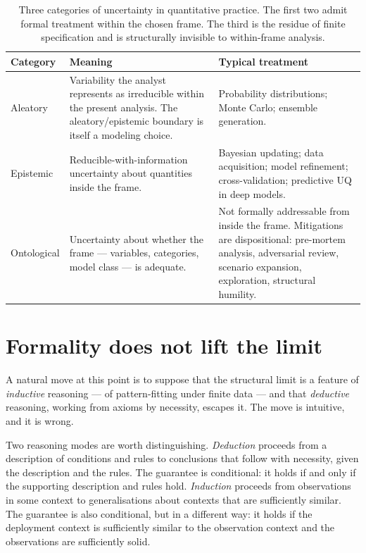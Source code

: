 \documentclass[11pt,a4paper]{article}
\begin{document}
\begin{table}[t]
\centering
\small
\begin{tabular}{p{} p{} p{}}
\toprule
\textbf{Category} & \textbf{Meaning} & \textbf{Typical treatment} \\
\midrule
Aleatory & Variability the analyst represents as irreducible within the
present analysis. The aleatory/epistemic boundary is itself a modeling
choice. & Probability distributions; Monte Carlo; ensemble generation. \\
\addlinespace
Epistemic & Reducible-with-information uncertainty about quantities
inside the frame. & Bayesian updating; data acquisition; model
refinement; cross-validation; predictive UQ in deep models. \\
\addlinespace
Ontological & Uncertainty about whether the frame --- variables,
categories, model class --- is adequate. & Not formally addressable from
inside the frame. Mitigations are dispositional: pre-mortem analysis,
adversarial review, scenario expansion, exploration, structural humility. \\
\bottomrule
\end{tabular}
\caption{Three categories of uncertainty in quantitative practice. The
first two admit formal treatment within the chosen frame. The third is
the residue of finite specification and is structurally invisible to
within-frame analysis.}
\label{tab:three-uncertainties}
\end{table}

\section{Formality does not lift the limit}
\label{sec:formality}

A natural move at this point is to suppose that the structural limit is a
feature of \emph{inductive} reasoning --- of pattern-fitting under finite
data --- and that \emph{deductive} reasoning, working from axioms by
necessity, escapes it. The move is intuitive, and it is wrong.

Two reasoning modes are worth distinguishing. \emph{Deduction} proceeds
from a description of conditions and rules to conclusions that follow with
necessity, given the description and the rules. The guarantee is
conditional: it holds if and only if the supporting description and rules
hold. \emph{Induction} proceeds from observations in some context to
generalisations about contexts that are sufficiently similar. The
guarantee is also conditional, but in a different way: it holds if the
deployment context is sufficiently similar to the observation context
and the observations are sufficiently solid.
\end{document}
